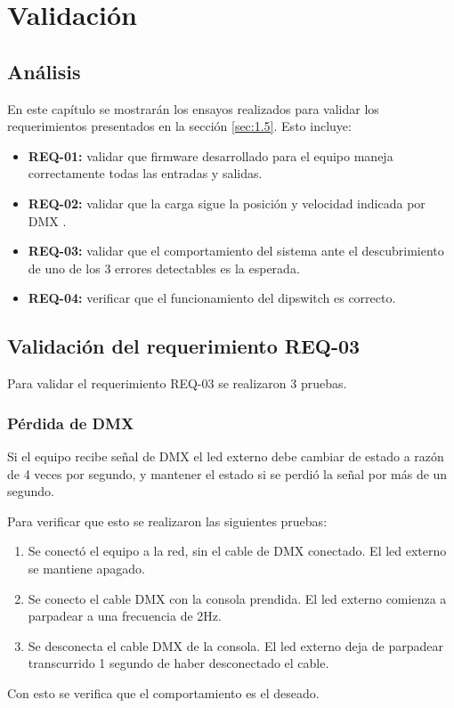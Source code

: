\chapter{Validación}
\thispagestyle{empty}

\section{Análisis} \label{sec:\thesection}
En este capítulo se mostrarán los ensayos realizados para validar los requerimientos presentados en la sección \ref{sec:1.5}. Esto incluye:
\begin{itemize}
	\item \textbf{REQ-01:} validar que firmware desarrollado para el equipo maneja correctamente todas las entradas y salidas.
	\item \textbf{REQ-02:} validar que la carga sigue la posición y velocidad indicada por DMX .
	\item \textbf{REQ-03:} validar que el comportamiento del sistema ante el descubrimiento de uno de los 3 errores detectables es la esperada. 
	\item \textbf{REQ-04:} verificar que el funcionamiento del dipswitch es correcto.
\end{itemize}

\section{Validación del requerimiento REQ-03} \label{sec:\thesection}
Para validar el requerimiento REQ-03 se realizaron 3 pruebas.
\subsection{Pérdida de DMX}
Si el equipo recibe señal de DMX el led externo debe cambiar de estado a razón de 4 veces por segundo, y mantener el estado si se perdió la señal por más de un segundo.

Para verificar que esto se realizaron las siguientes pruebas:
\begin{enumerate}
	\item Se conectó el equipo a la red, sin el cable de DMX conectado. El led externo se mantiene apagado.
	\item Se conecto el cable DMX con la consola prendida. El led externo comienza a parpadear a una frecuencia de 2Hz.
	\item Se desconecta el cable DMX de la consola. El led externo deja de parpadear transcurrido 1 segundo de haber desconectado el cable.
\end{enumerate}
Con esto se verifica que el comportamiento es el deseado.	
	 
